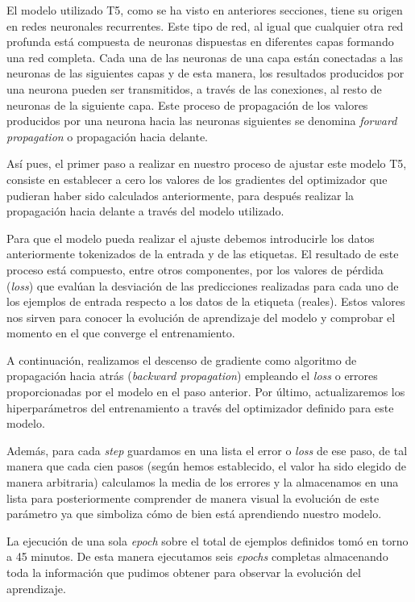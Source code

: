 El modelo utilizado T5, como se ha visto en anteriores secciones, tiene su origen en redes neuronales recurrentes. Este tipo de red, al igual que cualquier otra red profunda está compuesta de neuronas dispuestas en diferentes capas formando una red completa. Cada una de las neuronas de una capa están conectadas a las neuronas de las siguientes capas y de esta manera, los resultados producidos por una neurona pueden ser transmitidos, a través de las conexiones, al resto de neuronas de la siguiente capa. Este proceso de propagación de los valores producidos por una neurona hacia las neuronas siguientes se denomina \textit{forward propagation} o propagación hacia delante.

Así pues, el primer paso a realizar en nuestro proceso de ajustar este modelo T5, consiste en establecer a cero los valores de los gradientes del optimizador que pudieran haber sido calculados anteriormente, para después realizar la propagación hacia delante a través del modelo utilizado. 

Para que el modelo pueda realizar el ajuste debemos introducirle los datos anteriormente tokenizados de la entrada y de las etiquetas. El resultado de este proceso está compuesto, entre otros componentes, por los valores de pérdida (\textit{loss}) que evalúan la desviación de las predicciones realizadas para cada uno de los ejemplos de entrada respecto a los datos de la etiqueta (reales). Estos valores nos sirven para conocer la evolución de aprendizaje del modelo y comprobar el momento en el que converge el entrenamiento.

A continuación, realizamos el descenso de gradiente como algoritmo de propagación hacia atrás (\textit{backward propagation}) empleando el \textit{loss} o errores proporcionadas por el modelo en el paso anterior. Por último, actualizaremos los hiperparámetros del entrenamiento a través del optimizador definido para este modelo. 

Además, para cada \textit{step} guardamos en una lista el error o \textit{loss} de ese paso, de tal manera que cada cien pasos (según hemos establecido, el valor ha sido elegido de manera arbitraria) calculamos la media de los errores y la almacenamos en una lista para posteriormente comprender de manera visual la evolución de este parámetro ya que simboliza cómo de bien está aprendiendo nuestro modelo.

La ejecución de una sola \textit{epoch} sobre el total de ejemplos definidos tomó en torno a 45 minutos. De esta manera ejecutamos seis \textit{epochs} completas almacenando toda la información que pudimos obtener para observar la evolución del aprendizaje.


